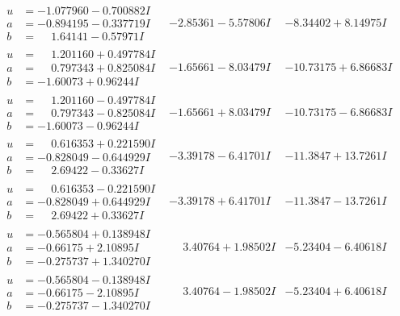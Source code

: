 \documentclass[1p]{elsarticle_modified}
\theoremstyle{definition}
\begin{document}
$$\begin{array}{c|c|c}
\begin{aligned}
u &= -1.077960 - 0.700882 I \\
a &= -0.894195 - 0.337719 I \\
b &= \phantom{-}1.64141 - 0.57971 I\end{aligned}
 & -2.85361 - 5.57806 I & -8.34402 + 8.14975 I \\ \hline\begin{aligned}
u &= \phantom{-}1.201160 + 0.497784 I \\
a &= \phantom{-}0.797343 + 0.825084 I \\
b &= -1.60073 + 0.96244 I\end{aligned}
 & -1.65661 - 8.03479 I & -10.73175 + 6.86683 I \\ \hline\begin{aligned}
u &= \phantom{-}1.201160 - 0.497784 I \\
a &= \phantom{-}0.797343 - 0.825084 I \\
b &= -1.60073 - 0.96244 I\end{aligned}
 & -1.65661 + 8.03479 I & -10.73175 - 6.86683 I \\ \hline\begin{aligned}
u &= \phantom{-}0.616353 + 0.221590 I \\
a &= -0.828049 - 0.644929 I \\
b &= \phantom{-}2.69422 - 0.33627 I\end{aligned}
 & -3.39178 - 6.41701 I & -11.3847 + 13.7261 I \\ \hline\begin{aligned}
u &= \phantom{-}0.616353 - 0.221590 I \\
a &= -0.828049 + 0.644929 I \\
b &= \phantom{-}2.69422 + 0.33627 I\end{aligned}
 & -3.39178 + 6.41701 I & -11.3847 - 13.7261 I \\ \hline\begin{aligned}
u &= -0.565804 + 0.138948 I \\
a &= -0.66175 + 2.10895 I \\
b &= -0.275737 + 1.340270 I\end{aligned}
 & \phantom{-}3.40764 + 1.98502 I & -5.23404 - 6.40618 I \\ \hline\begin{aligned}
u &= -0.565804 - 0.138948 I \\
a &= -0.66175 - 2.10895 I \\
b &= -0.275737 - 1.340270 I\end{aligned}
 & \phantom{-}3.40764 - 1.98502 I & -5.23404 + 6.40618 I \\ \hline\begin{aligned}

\end{aligned}
\end{array}$$
\end{document}
